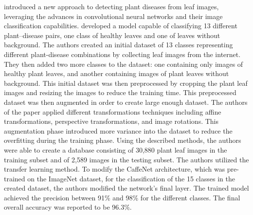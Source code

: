 \documentclass{BachelorBUI}
\begin{document}
\textcite{Sladojevic:2016} introduced a new approach to detecting plant diseases from leaf images, leveraging the advances in convolutional neural networks and their image classification capabilities. \textcite{Sladojevic:2016} developed a model capable of classifying 13 different plant--disease pairs, one class of healthy leaves and one of leaves without background. The authors created an initial dataset of 13 classes representing different plant-disease combinations by collecting leaf images from the internet. They then added two more classes to the dataset: one containing only images of healthy plant leaves, and another containing images of plant leaves without background. This initial dataset was then preprocessed by cropping the plant leaf images and resizing the images to reduce the training time. This preprocessed dataset was then augmented in order to create large enough dataset. The authors of the paper applied different transformations techniques including affine transformations, perspective transformations, and image rotations. This augmentation phase introduced more variance into the dataset to reduce the overfitting during the training phase. Using the described methods, the authors were able to create a database consisting of 30,880 plant leaf images in the training subset and of 2,589 images in the testing subset. The authors utilized the transfer learning method. To modify the CaffeNet architecture, which was pre-trained on the ImageNet dataset, for the classification of the 15 classes in the created dataset, the authors modified the network's final layer. The trained model achieved the precision between 91\% and 98\% for the different classes. The final overall accuracy was reported to be 96.3\%.
\end{document}

